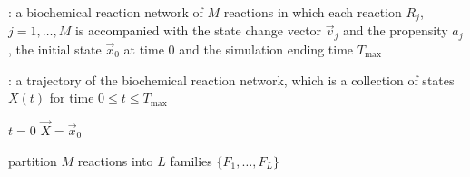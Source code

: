 \begin{algorithm}[H]
\DontPrintSemicolon
{}

\caption{\protect\TitleFunction{}}
\label{algo:ffm}

\Input: a biochemical reaction network of $M$ reactions in which each reaction $R_j$, $j=1, \dots, M$ is accompanied with the state change vector $\vec{v}_j$ and the propensity $a_j$, the initial state $\vec{x}_0$ at time $0$ and the simulation ending time $T_{\max}$\;

\Output: a trajectory of the biochemical reaction network, which is a collection of states $X(t)$ for time $0\le t\le T_{\max}$\;

$t = 0$\;
$\vec{X} = \vec{x}_0$\;

partition $M$ reactions into $L$ families $\{F_1,\dots,F_L\}$\;


\end{algorithm}
